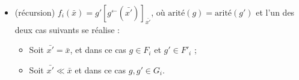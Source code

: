 \documentclass{report}
\newcommand{\eqpred}[3]{#1\left[ #2^{\leftarrow}(#3) \right]_{#3}}
\begin{document}
\begin{definition}[$a$-LSRS]
\begin{itemize}[itemsep=-1mm]
				\item 	(récursion)		$f_i\left(\bar{x}\right) = \eqpred{g'}{g}{\bar{x'}}$, où $\text{arité}(g) = \text{arité}(g')$ et l'un des deux cas suivants se réalise :
						\begin{itemize}[itemsep=-1mm]
							\item 	Soit $\bar{x'} = \bar{x}$, et dans ce cas $g \in F_i$ et $g' \in F'_i$ ;
							\item 	Soit $\bar{x'} \ll \bar{x}$ et dans ce cas $g, g' \in G_i$. 
						\end{itemize}
%						
%						
			\end{itemize}
			
		\end{definition}
		
\end{document}
